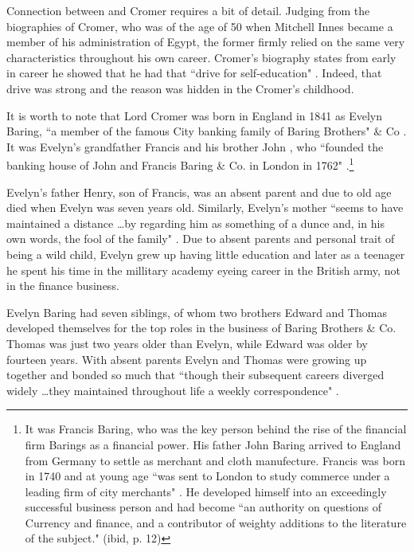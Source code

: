 Connection between \citeauthor{innes1913} and Cromer requires a bit of detail. Judging from the biographies of Cromer, who was of the age of 50 when Mitchell Innes became a member of his administration of Egypt, the former firmly relied on the same very characteristics throughout his own career. Cromer's biography states from early in career he showed that he had that ``drive for self-education" \citep[pp.~19-20]{roger2004}. Indeed, that drive was strong and the reason was hidden in the Cromer's childhood.

It is worth to note that Lord Cromer was born in England in 1841 as Evelyn Baring, ``a member of the famous City banking family of Baring Brothers" \& Co  \citep[p.~viii]{roger2004}. It was Evelyn's grandfather Francis and his brother John \citep[p.~19]{zetland1932}, who ``founded the banking house of John and Francis Baring \& Co. in London in 1762" \citep[p.~3]{roger2004}.\footnote{It was Francis Baring, who was the key person behind the rise of the financial firm Barings as a financial power. His father John Baring arrived to England from Germany to settle as merchant and cloth manufecture. Francis was born in 1740 and at young age ``was sent to London to study commerce under a leading firm of city merchants" \citep[p.~11]{traill1897}. He developed himself into an exceedingly successful business person and had become ``an authority on questions of Currency and finance, and a contributor of weighty additions to the literature of the subject." (ibid, p. 12)} 

Evelyn's father Henry, son of Francis, was an absent parent and due to old age died when Evelyn was seven years old. Similarly, Evelyn's mother ``seems to have maintained a distance \dots by regarding him as something of a dunce and, in his own words, the fool of the family" \citep[p.~7]{roger2004}. Due to absent parents and personal trait of being a wild child, Evelyn grew up having little education and later as a teenager he spent his time in the millitary academy eyeing career in the British army, not in the finance business. 

Evelyn Baring had seven siblings, of whom two brothers Edward and Thomas developed themselves for the top roles in the business of Baring Brothers \& Co. Thomas was just two years older than Evelyn, while Edward was older by fourteen years. With absent parents Evelyn and Thomas were growing up together and bonded so much that ``though their subsequent careers diverged widely \dots they maintained throughout life a weekly correspondence" \citep[p.~22]{zetland1932}. 

